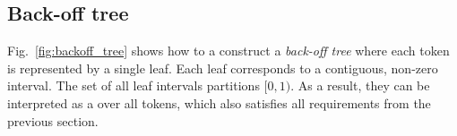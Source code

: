 \documentclass{IIBproject}
\makeatletter
\DeclareRobustCommand*{\AbbreviationWithDot}[1]{\@ifnextchar{.}{#1}{#1.\@\xspace}}
\DeclareRobustCommand*{\pmf}{\AbbreviationWithDot{p.m.f}}
\makeatother
\begin{document}
\subsection{Back-off tree}

Fig.~\ref{fig:backoff_tree} shows how to a construct a \emph{back-off tree} where each token is represented by a single leaf. Each leaf corresponds to a contiguous, non-zero interval. The set of all leaf intervals partitions $[0,1)$. As a result, they can be interpreted as a \pmf over all tokens, which also satisfies all requirements from the previous section.

\newlength{\vertexSize}
\setlength{\vertexSize}{10 pt}


%
\newcommand{\rootVertex}[2] {
	\node [vertex,fill=black!0] at (#1,#2) {};
}

%
\newcommand{\backoff}[6] {
	\draw [shorten >= 0.5*(\vertexSize+\pgflinewidth), shorten <= 0.5*(\vertexSize+\pgflinewidth), ->] (#1,#2) to [bend #5=12.5] (#3,#4);
	\node [vertex,fill=black!10] at (#3,#4) {\tiny #6};
}

%
\newcommand{\leaf}[6] {
	\draw [shorten >= 0.5*(\vertexSize+\pgflinewidth), shorten <= 0.5*(\vertexSize+\pgflinewidth), ->] (#1,#2) to [bend #5=12.5] (#3,#4);
	\node [vertex,fill=black!0] at (#3,#4) {\tiny #6};
}
\end{document}
